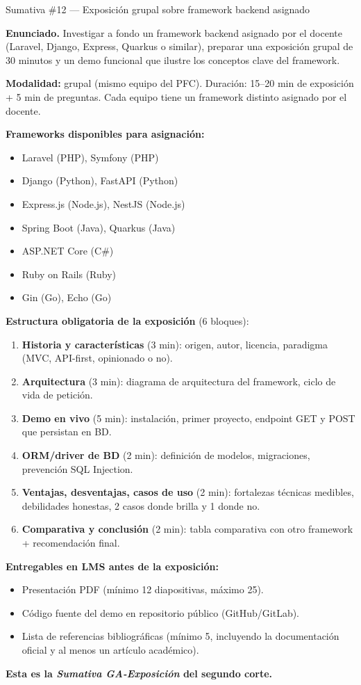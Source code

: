\begin{cajaejercicio}{Sumativa \#12 --- Exposición grupal sobre framework backend asignado}


\textbf{Enunciado.} Investigar a fondo un framework backend asignado por el docente (Laravel, Django, Express, Quarkus o similar), preparar una exposición grupal de 30 minutos y un demo funcional que ilustre los conceptos clave del framework.

\textbf{Modalidad:} grupal (mismo equipo del PFC). Duración: 15--20
min de exposición + 5 min de preguntas. Cada equipo tiene un
framework distinto asignado por el docente.

\textbf{Frameworks disponibles para asignación:}
\begin{itemize}
\item Laravel (PHP), Symfony (PHP)
\item Django (Python), FastAPI (Python)
\item Express.js (Node.js), NestJS (Node.js)
\item Spring Boot (Java), Quarkus (Java)
\item ASP.NET Core (C\#)
\item Ruby on Rails (Ruby)
\item Gin (Go), Echo (Go)
\end{itemize}

\textbf{Estructura obligatoria de la exposición} (6 bloques):

\begin{enumerate}
\item \textbf{Historia y características} (3 min): origen, autor,
licencia, paradigma (MVC, API-first, opinionado o no).
\item \textbf{Arquitectura} (3 min): diagrama de arquitectura del
framework, ciclo de vida de petición.
\item \textbf{Demo en vivo} (5 min): instalación, primer proyecto,
endpoint GET y POST que persistan en BD.
\item \textbf{ORM/driver de BD} (2 min): definición de modelos,
migraciones, prevención SQL Injection.
\item \textbf{Ventajas, desventajas, casos de uso} (2 min):
fortalezas técnicas medibles, debilidades honestas, 2 casos donde
brilla y 1 donde no.
\item \textbf{Comparativa y conclusión} (2 min): tabla comparativa
con otro framework + recomendación final.
\end{enumerate}

\textbf{Entregables en LMS antes de la exposición:}
\begin{itemize}
\item Presentación PDF (mínimo 12 diapositivas, máximo 25).
\item Código fuente del demo en repositorio público (GitHub/GitLab).
\item Lista de referencias bibliográficas (mínimo 5, incluyendo la
documentación oficial y al menos un artículo académico).
\end{itemize}

\textbf{Esta es la \emph{Sumativa GA-Exposición} del segundo corte.}
\end{cajaejercicio}

